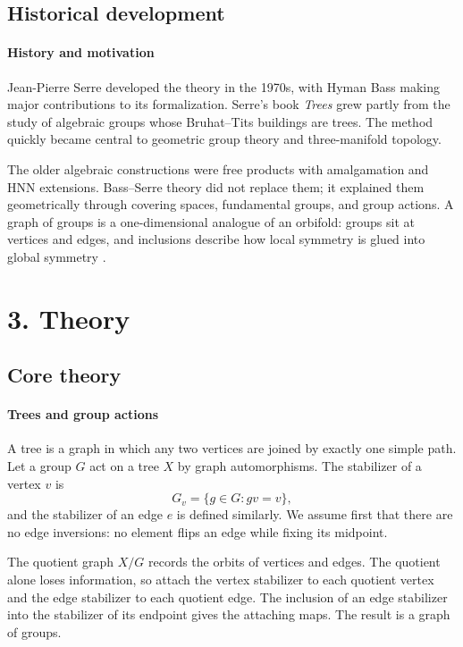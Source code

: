 \subsection*{Historical development}
\begin{historylist}
\paragraph{History and motivation}

Jean-Pierre Serre developed the theory in the 1970s, with Hyman Bass making major contributions to its formalization. Serre's book \emph{Trees} grew partly from the study of algebraic groups whose Bruhat--Tits buildings are trees. The method quickly became central to geometric group theory and three-manifold topology.

The older algebraic constructions were free products with amalgamation and HNN extensions. Bass--Serre theory did not replace them; it explained them geometrically through covering spaces, fundamental groups, and group actions. A graph of groups is a one-dimensional analogue of an orbifold: groups sit at vertices and edges, and inclusions describe how local symmetry is glued into global symmetry \cite{bass_serre_theory_ref1,bass_serre_theory_ref3}.

\end{historylist}
\section*{3. Theory}
\subsection*{Core theory}
\paragraph{Trees and group actions}

A tree is a graph in which any two vertices are joined by exactly one simple path. Let a group $G$ act on a tree $X$ by graph automorphisms. The stabilizer of a vertex $v$ is
\[
 G_v=\{g\in G:gv=v\},
\]
and the stabilizer of an edge $e$ is defined similarly. We assume first that there are no edge inversions: no element flips an edge while fixing its midpoint.

The quotient graph $X/G$ records the orbits of vertices and edges. The quotient alone loses information, so attach the vertex stabilizer to each quotient vertex and the edge stabilizer to each quotient edge. The inclusion of an edge stabilizer into the stabilizer of its endpoint gives the attaching maps. The result is a graph of groups.

